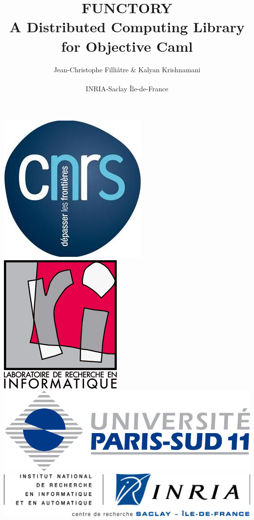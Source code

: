 \documentclass[xcolor=dvipsnames,8pt]{beamer}
\begin{document}

\title{FUNCTORY \\ A Distributed Computing Library for Objective Caml}

\author[Kalyan]{Jean-Christophe Filli\^{a}tre \& Kalyan Krishnamani\\
  \- \\ 
  INRIA-Saclay \^{I}le-de-France}
\date {}


\bigskip
\begin{frame}
  \titlepage
  \begin{center}
    \includegraphics[scale=0.11]{cnrs-logo2.jpg}
    \hspace{4mm}
    \includegraphics[scale=0.09]{lrilogo.jpg}
    \hspace{4mm}
    \includegraphics[scale=0.09]{upsudlogo.jpg}
    \hspace{4mm}
    \includegraphics[scale=0.4]{inria-saclay.jpeg}
  \end{center}
\end{frame}
\end{document}
